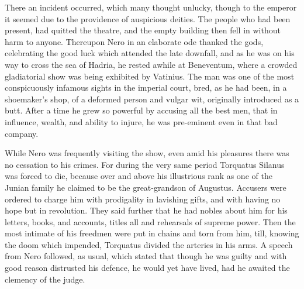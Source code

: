 
There an incident occurred, which many thought unlucky, though to the emperor it seemed due to the providence of auspicious deities. The people who had been present, had quitted the theatre, and the empty building then fell in without harm to anyone. Thereupon Nero in an elaborate ode thanked the gods, celebrating the good luck which attended the late downfall, and as he was on his way to cross the sea of Hadria, he rested awhile at Beneventum, where a crowded gladiatorial show was being exhibited by Vatinius. The man was one of the most conspicuously infamous sights in the imperial court, bred, as he had been, in a shoemaker's shop, of a deformed person and vulgar wit, originally introduced as a butt. After a time he grew so powerful by accusing all the best men, that in influence, wealth, and ability to injure, he was pre-eminent even in that bad company.


While Nero was frequently visiting the show, even amid his pleasures there was no cessation to his crimes. For during the very same period Torquatus Silanus was forced to die, because over and above his illustrious rank as one of the Junian family he claimed to be the great-grandson of Augustus. Accusers were ordered to charge him with prodigality in lavishing gifts, and with having no hope but in revolution. They said further that he had nobles about him for his letters, books, and accounts, titles all and rehearsals of supreme power. Then the most intimate of his freedmen were put in chains and torn from him, till, knowing the doom which impended, Torquatus divided the arteries in his arms. A speech from Nero followed, as usual, which stated that though he was guilty and with good reason distrusted his defence, he would yet have lived, had he awaited the clemency of the judge.


